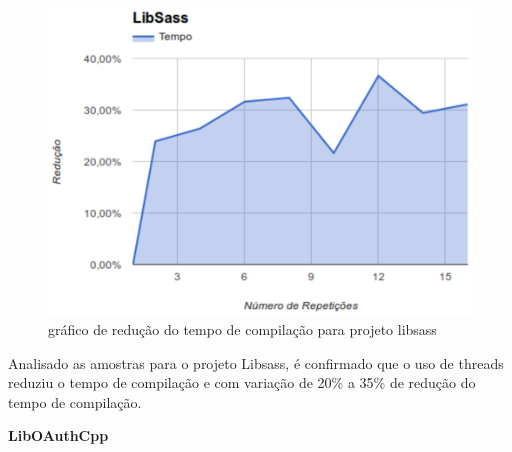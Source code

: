 \begin{figure}[h]
    \centering
        \includegraphics[keepaspectratio=true,scale=1]{figuras/libsass.eps}
    \caption{gráfico de redução do tempo de compilação para projeto libsass}
    \label{libsass}
\end{figure}

Analisado as amostras para o projeto Libsass, é confirmado que o
 uso de threads reduziu o tempo de compilação e com variação
 de 20\% a 35\% de redução do tempo de compilação.

\textbf{LibOAuthCpp}

